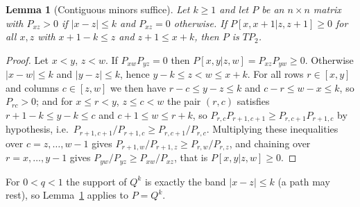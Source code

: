 \documentclass[11pt,a4paper]{article}
\newtheorem{lemma}[theorem]{Lemma}
\theoremstyle{definition}
\theoremstyle{remark}
\begin{document}
\begin{lemma}[Contiguous minors suffice]\label{lem:contig}
Let $k\ge1$ and let $P$ be an $n\times n$ matrix with $P_{xz}>0$ if $|x-z|\le k$ and $P_{xz}=0$ otherwise. If
$P[x,x+1|z,z+1]\ge0$ for all $x,z$ with $x+1-k\le z$ and $z+1\le x+k$, then $P$ is $TP_2$.
\end{lemma}
\begin{proof}
Let $x<y$, $z<w$. If $P_{xw}P_{yz}=0$ then $P[x,y|z,w]=P_{xz}P_{yw}\ge0$. Otherwise $|x-w|\le k$ and $|y-z|\le k$, hence
$y-k\le z<w\le x+k$. For all rows $r\in[x,y]$ and columns $c\in[z,w]$ we then have $r-c\le y-z\le k$ and
$c-r\le w-x\le k$, so $P_{rc}>0$; and for $x\le r<y$, $z\le c<w$ the pair $(r,c)$ satisfies $r+1-k\le y-k\le c$ and
$c+1\le w\le r+k$, so $P_{r,c}P_{r+1,c+1}\ge P_{r,c+1}P_{r+1,c}$ by hypothesis, i.e.\
$P_{r+1,c+1}/P_{r+1,c}\ge P_{r,c+1}/P_{r,c}$. Multiplying these inequalities over $c=z,\dots,w-1$ gives
$P_{r+1,w}/P_{r+1,z}\ge P_{r,w}/P_{r,z}$, and chaining over $r=x,\dots,y-1$ gives $P_{yw}/P_{yz}\ge P_{xw}/P_{xz}$, that is
$P[x,y|z,w]\ge0$.
\end{proof}

For $0<q<1$ the support of $Q^k$ is exactly the band $|x-z|\le k$ (a path may rest), so Lemma~\ref{lem:contig}
applies to $P=Q^k$.
\end{document}
